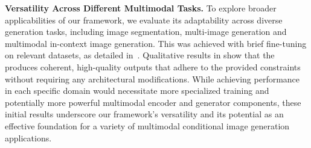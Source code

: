 \textbf{Versatility Across Different Multimodal Tasks.}
To explore broader applicabilities of our framework, we evaluate its adaptability across diverse generation tasks, including image segmentation,  multi-image generation and multimodal in-context image generation. This was achieved with brief fine-tuning on relevant datasets, as detailed in~. Qualitative results in  show that the \model produces coherent, high-quality outputs that adhere to the provided constraints without requiring any architectural modifications. While achieving  performance in each specific domain would necessitate more specialized training and potentially more powerful multimodal encoder and generator components, these initial results underscore our framework's versatility and its potential as an effective foundation for a variety of multimodal conditional image generation applications.
 








